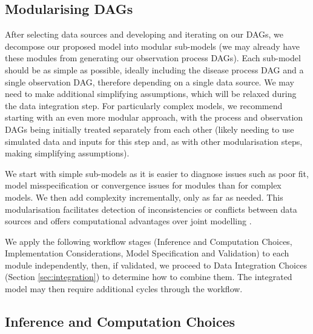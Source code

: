 \documentclass{article}
\begin{document}
\subsection{Modularising DAGs} \label{sec:modularise}

After selecting data sources and developing and iterating on our \ac{DAG}s, we decompose our proposed model into modular sub-models (we may already have these modules from generating our observation process \ac{DAG}s).
Each sub-model should be as simple as possible, ideally including the disease process DAG and a single observation DAG, therefore depending on a single data source.
We may need to make additional simplifying assumptions, which will be relaxed during the data integration step.
For particularly complex models, we recommend starting with an even more modular approach, with the process and observation DAGs being initially treated separately from each other (likely needing to use simulated data and inputs for this step and, as with other modularisation steps, making simplifying assumptions).

We start with simple sub-models as it is easier to diagnose issues such as poor fit, model misspecification or convergence issues for modules than for complex models.
We then add complexity incrementally, only as far as needed.
This modularisation facilitates detection of inconsistencies or conflicts between data sources \citep{presanis2013conflict,manderson2023combining} and offers computational advantages over joint modelling \citep{deangelis2018analysing,goudie2019joining,gelman2020bayesian,nicholson2022interoperability}.

We apply the following workflow stages (Inference and Computation Choices, Implementation Considerations, Model Specification and Validation) to each module independently, then, if validated, we proceed to Data Integration Choices (Section \ref{sec:integration}) to determine how to combine them.
The integrated model may then require additional cycles through the workflow.

\subsection{Inference and Computation Choices}\label{sec:fitting}
\end{document}
